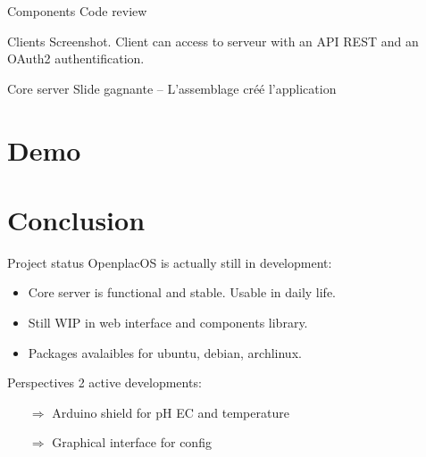 \documentclass{beamer}
\begin{document}
\begin{frame}{Components}
Code review
\end{frame}

\begin{frame}{Clients}
Screenshot.
Client can access to serveur with an API REST and an OAuth2 authentification.
\end{frame}

\begin{frame}{Core server}
Slide gagnante -- L'assemblage créé l'application
\end{frame}

\section{Demo}

\section{Conclusion}
\begin{frame}{Project status}
OpenplacOS is actually still in development:
 \begin{itemize}

\item Core server is functional and stable. Usable in daily life.
\item Still WIP in web interface and components library.
\item Packages avalaibles for ubuntu, debian, archlinux. 
\end{itemize}
\end{frame}
\begin{frame}{Perspectives}
2 active developments:
 \begin{itemize}
\item[$\Rightarrow$] Arduino shield for pH EC and temperature
\item[$\Rightarrow$] Graphical interface for config
\end{itemize}
\end{frame}
\end{document}
